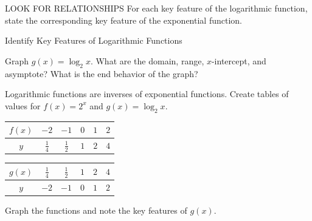 \documentclass{article}
\newenvironment{concept-box}{}{}        %
\newenvironment{example}[1]{}{}         %
\begin{document}
\begin{concept-box}
LOOK FOR RELATIONSHIPS For each key feature of the logarithmic function, state the corresponding key feature of the exponential function.
\end{concept-box}

\begin{example}{1}
Identify Key Features of Logarithmic Functions

Graph $g(x)=\log_2 x$. What are the domain, range, $x$-intercept, and asymptote? What is the end behavior of the graph?

Logarithmic functions are inverses of exponential functions. Create tables of values for $f(x)=2^x$ and $g(x)=\log_2 x$.

\begin{center}
\begin{tabular}{c|ccccc}
\toprule
$f(x)$ & $-2$ & $-1$ & $0$ & $1$ & $2$ \\
\midrule
$y$ & $\frac14$ & $\frac12$ & $1$ & $2$ & $4$ \\
\bottomrule
\end{tabular}
\qquad
\begin{tabular}{c|ccccc}
\toprule
$g(x)$ & $\frac14$ & $\frac12$ & $1$ & $2$ & $4$ \\
\midrule
$y$ & $-2$ & $-1$ & $0$ & $1$ & $2$ \\
\bottomrule
\end{tabular}
\end{center}

Graph the functions and note the key features of $g(x)$.

\begin{center}
\end{center}


\end{example}
\end{document}
